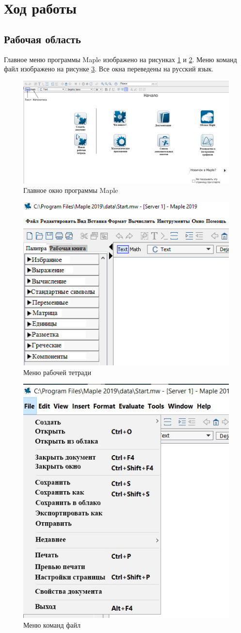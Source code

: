 \documentclass[a4paper,14pt]{extarticle}
\begin{document}
    \section{Ход работы}
    \subsection{Рабочая область}
    Главное меню программы Maple изображено на рисунках \ref{fig:window-main}
    и \ref{fig:window-layout}. Меню команд файл изображено на рисунке \ref{fig:file}.
    Все окна переведены на русский язык.
    \begin{figure}[H]
        \centering
        \includegraphics[width=.8\linewidth]{window-main}
        \caption{Главное окно программы Maple}
        \label{fig:window-main}
    \end{figure}
    \begin{figure}[H]
        \centering
        \includegraphics[width=.4\linewidth]{window-layout}
        \caption{Меню рабочей тетради}
        \label{fig:window-layout}
    \end{figure}
    \begin{figure}[H]
        \centering
        \includegraphics[width=.4\linewidth]{file}
        \caption{Меню команд файл}
        \label{fig:file}
    \end{figure}
\end{document}
